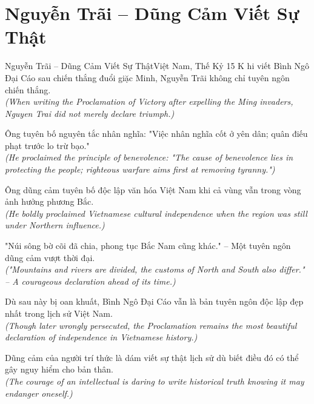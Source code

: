 \section{Nguyễn Trãi -- Dũng Cảm Viết Sự Thật}
\begin{truyen}{Nguyễn Trãi -- Dũng Cảm Viết Sự Thật}{Việt Nam, Thế Kỷ 15}
K hi viết Bình Ngô Đại Cáo sau chiến thắng đuổi giặc Minh, Nguyễn Trãi không chỉ tuyên ngôn chiến thắng.\\
\textit{(When writing the Proclamation of Victory after expelling the Ming invaders, Nguyen Trai did not merely declare triumph.)}

Ông tuyên bố nguyên tắc nhân nghĩa: "Việc nhân nghĩa cốt ở yên dân; quân điếu phạt trước lo trừ bạo."\\
\textit{(He proclaimed the principle of benevolence: "The cause of benevolence lies in protecting the people; righteous warfare aims first at removing tyranny.")}

Ông dũng cảm tuyên bố độc lập văn hóa Việt Nam khi cả vùng vẫn trong vòng ảnh hưởng phương Bắc.\\
\textit{(He boldly proclaimed Vietnamese cultural independence when the region was still under Northern influence.)}

"Núi sông bờ cõi đã chia, phong tục Bắc Nam cũng khác." -- Một tuyên ngôn dũng cảm vượt thời đại.\\
\textit{("Mountains and rivers are divided, the customs of North and South also differ." -- A courageous declaration ahead of its time.)}

Dù sau này bị oan khuất, Bình Ngô Đại Cáo vẫn là bản tuyên ngôn độc lập đẹp nhất trong lịch sử Việt Nam.\\
\textit{(Though later wrongly persecuted, the Proclamation remains the most beautiful declaration of independence in Vietnamese history.)}

\end{truyen}
\begin{baihoc}
  Dũng cảm của người trí thức là dám viết sự thật lịch sử dù biết điều đó có thể gây nguy hiểm cho bản thân.\\
  \textit{(The courage of an intellectual is daring to write historical truth knowing it may endanger oneself.)}
\end{baihoc}


